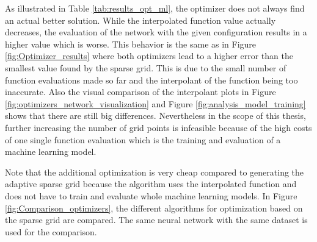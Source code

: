 As illustrated in Table \ref{tab:results_opt_ml}, the optimizer does not always find an actual better solution. While the interpolated function value actually decreases, the evaluation of the network with the given configuration results in a higher value which is worse. This behavior is the same as in Figure \ref{fig:Optimizer_results} where both optimizers lead to a higher error than the smallest value found by the sparse grid. This is due to the small number of function evaluations made so far and the interpolant of the function being too inaccurate. Also the visual comparison of the interpolant plots in Figure \ref{fig:optimizers_network_visualization} and Figure \ref{fig:analysis_model_training} shows that there are still big differences. Nevertheless in the scope of this thesis, further increasing the number of grid points is infeasible because of the high costs of one single function evaluation which is the training and evaluation of a machine learning model. \newline

Note that the additional optimization is very cheap compared to generating the adaptive sparse grid because the algorithm uses the interpolated function and does not have to train and evaluate whole machine learning models. In Figure \ref{fig:Comparison_optimizers}, the different algorithms for optimization based on the sparse grid are compared. The same neural network with the same dataset is used for the comparison.


